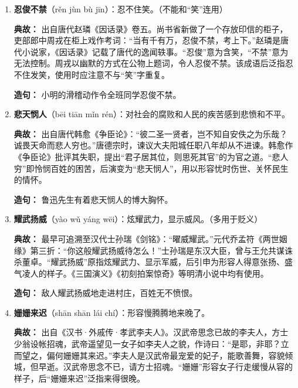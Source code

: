 \begin{enumerate}[leftmargin=*]
    \textbf{典故：} 最早出自秦·孔鲋《孔丛子·公孙龙》：“使此人于广庭大众之中，见侮而不敢斗，王将以为臣乎？”《孔丛子》是一部记录孔子及其弟子言行的著作。书中记载了尹文与齐湣王的对话：若一个人在公众场合受人侮辱却不敢反抗，这样的“士人”是否值得任用？“广庭大众”后演变为“大庭广众”，用以指人数众多的公开场合。
    
    \textbf{造句：} 他从未在大庭广众之下发过脾气。

    \item \textbf{忍俊不禁}（rěn jùn bù jīn）：忍不住笑。（不能和“笑”连用）
    
    \textbf{典故：} 出自唐代赵璘《因话录》卷五。尚书省新做了一个存放印信的柜子，吏部郎中周戎在柜上戏作考词：“当有千有万，忍俊不禁，考上下。”赵璘是唐代小说家，《因话录》记载了唐代的逸闻轶事。“忍俊”意为含笑，“不禁”意为无法控制。周戎以幽默的方式在公物上题词，令人忍俊不禁。该成语后泛指忍不住发笑，使用时应注意不与“笑”字重复。
    
    \textbf{造句：} 小明的滑稽动作令全班同学忍俊不禁。

    \item \textbf{悲天悯人}（bēi tiān mǐn rén）：对社会的腐败和人民的疾苦感到悲愤和不平。
    
    \textbf{典故：} 出自唐代韩愈《争臣论》：“彼二圣一贤者，岂不知自安佚之为乐哉？诚畏天命而悲人穷也。”唐德宗时，谏议大夫阳城任职八年却从不进谏。韩愈作《争臣论》批评其失职，提出“君子居其位，则思死其官”的为官之道。“悲人穷”即怜悯百姓的困苦，后演变为“悲天悯人”，用以形容忧时伤世、关怀民生的情怀。
    
    \textbf{造句：} 鲁迅先生有着悲天悯人的博大胸怀。

    \item \textbf{耀武扬威}（yào wǔ yáng wēi）：炫耀武力，显示威风。（多用于贬义）
    
    \textbf{典故：} 最早可追溯至汉代士孙瑞《剑铭》：“曜威耀武。”元代乔孟符《两世姻缘》第三折：“你这般耀武扬威待怎么！”士孙瑞是东汉大臣，曾与王允共谋诛杀董卓。“耀武扬威”原指炫耀武力、显示军威，后引申为形容人得意张扬、盛气凌人的样子。《三国演义》《初刻拍案惊奇》等明清小说中均有使用。
    
    \textbf{造句：} 敌人耀武扬威地走进村庄，百姓无不愤恨。

    \item \textbf{姗姗来迟}（shān shān lái chí）：形容慢腾腾地来晚了。
    
    \textbf{典故：} 出自《汉书·外戚传·孝武李夫人》。汉武帝思念已故的李夫人，方士少翁设帐招魂，武帝遥望见一女子如李夫人之貌，作诗曰：“是耶，非耶？立而望之，偏何姗姗其来迟。”李夫人是汉武帝最宠爱的妃子，能歌善舞，容貌倾城，但早逝。汉武帝思念不已，请方士招魂。“姗姗”形容女子行走缓慢从容的样子，后“姗姗来迟”泛指来得很晚。
    

\end{enumerate}

